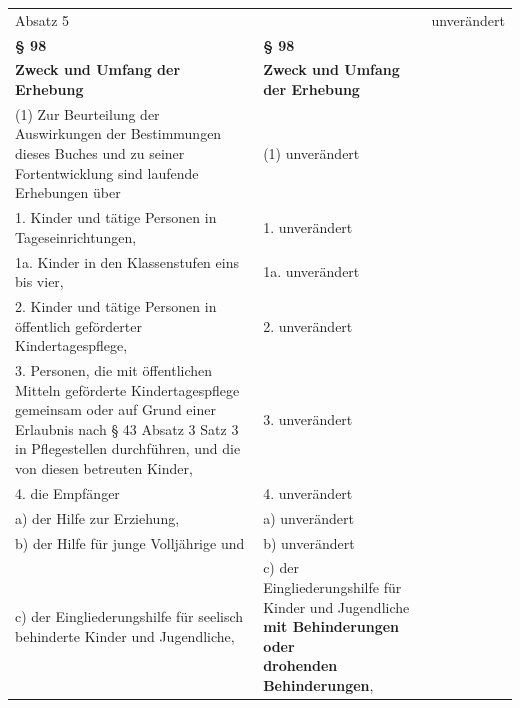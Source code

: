 \documentclass[10pt,a4paper,landscape]{article}
\begin{document}
\begin{longtable}{|L{8.2cm}|L{8.2cm}|L{8.2cm}|}
\hhline{|---|}
Absatz 5 &  & unverändert \\
\hhline{|---|}
\textbf{\S{} 98} & \textbf{\S{} 98} &  \\
\hhline{|---|}
\textbf{Zweck und Umfang der Erhebung } & \textbf{Zweck und Umfang der Erhebung } &  \\
\hhline{|---|}
(1) Zur Beurteilung der Auswirkungen der  \newline Bestimmungen dieses Buches und zu  \newline seiner Fortentwicklung sind laufende  \newline Erhebungen über & (1) unverändert &  \\
\hhline{|---|}
1.   \newline Kinder und tätige Personen in  \newline Tageseinrichtungen, & 1. unverändert &  \\
\hhline{|---|}
1a.   \newline Kinder in den Klassenstufen eins bis vier, & 1a. unverändert &  \\
\hhline{|---|}
2.   \newline Kinder und tätige Personen in öffentlich  \newline geförderter Kindertagespflege, & 2. unverändert &  \\
\hhline{|---|}
3.   \newline Personen, die mit öffentlichen Mitteln  \newline geförderte Kindertagespflege gemeinsam  \newline oder auf Grund einer Erlaubnis nach \S{} 43  \newline Absatz 3 Satz 3 in Pflegestellen  \newline durchführen, und die von diesen betreuten  \newline Kinder, & 3. unverändert &  \\
\hhline{|---|}
4.   \newline die Empfänger & 4. unverändert &  \\
\hhline{|---|}
a)   \newline der Hilfe zur Erziehung, & a) unverändert &  \\
\hhline{|---|}
b)   \newline der Hilfe für junge Volljährige und & b) unverändert &  \\
\hhline{|---|}
c)   \newline der Eingliederungshilfe für seelisch  \newline behinderte Kinder und Jugendliche, & c)   \newline der Eingliederungshilfe für Kinder und  \newline Jugendliche \textbf{\textcolor{diffred}{mit Behinderungen oder  \newline drohenden Behinderungen}}, &  \\

\end{longtable}
\end{document}
